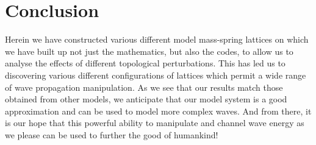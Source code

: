\chapter{Conclusion}
Herein we have constructed various different model mass-spring lattices on
which we have built up not just the mathematics, but also the codes, to allow
us to analyse the effects of different topological perturbations. This has led
us to discovering various different configurations of lattices which permit a
wide range of wave propagation manipulation. As we see that our results match
those obtained from other models, we anticipate that our model system is a good
approximation and can be used to model more complex waves. And from there, it
is our hope that this powerful ability to manipulate and channel wave energy as
we please can be used to further the good of humankind!

\bigskip
\bigskip

